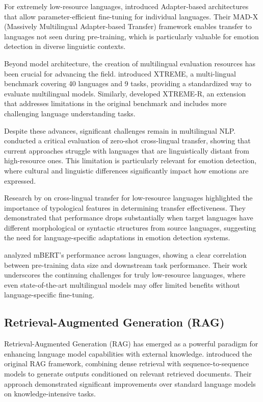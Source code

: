 \documentclass[a4paper,12pt]{extarticle}
\begin{document}
For extremely low-resource languages, \cite{pfeiffer2020mad} introduced Adapter-based architectures that allow parameter-efficient fine-tuning for individual languages. Their MAD-X (Massively Multilingual Adapter-based Transfer) framework enables transfer to languages not seen during pre-training, which is particularly valuable for emotion detection in diverse linguistic contexts.

Beyond model architecture, the creation of multilingual evaluation resources has been crucial for advancing the field. \cite{hu2020xtreme} introduced XTREME, a multi-lingual benchmark covering 40 languages and 9 tasks, providing a standardized way to evaluate multilingual models. Similarly, \cite{ruder2021xtreme} developed XTREME-R, an extension that addresses limitations in the original benchmark and includes more challenging language understanding tasks.

Despite these advances, significant challenges remain in multilingual NLP. \cite{artetxe2020cross} conducted a critical evaluation of zero-shot cross-lingual transfer, showing that current approaches struggle with languages that are linguistically distant from high-resource ones. This limitation is particularly relevant for emotion detection, where cultural and linguistic differences significantly impact how emotions are expressed.

Research by \cite{ponti2019modeling} on cross-lingual transfer for low-resource languages highlighted the importance of typological features in determining transfer effectiveness. They demonstrated that performance drops substantially when target languages have different morphological or syntactic structures from source languages, suggesting the need for language-specific adaptations in emotion detection systems.

\cite{wu2020all} analyzed mBERT's performance across languages, showing a clear correlation between pre-training data size and downstream task performance. Their work underscores the continuing challenges for truly low-resource languages, where even state-of-the-art multilingual models may offer limited benefits without language-specific fine-tuning.

\subsection{Retrieval-Augmented Generation (RAG)}

Retrieval-Augmented Generation (RAG) has emerged as a powerful paradigm for enhancing language model capabilities with external knowledge. \cite{lewis2020retrieval} introduced the original RAG framework, combining dense retrieval with sequence-to-sequence models to generate outputs conditioned on relevant retrieved documents. Their approach demonstrated significant improvements over standard language models on knowledge-intensive tasks.
\end{document}
